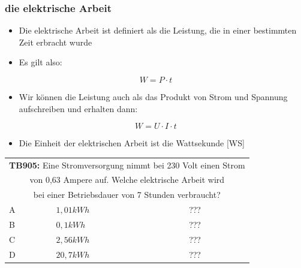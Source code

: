 \begin{frame}
	\frametitle{die elektrische Arbeit}
	\begin{itemize}
		\item	Die elektrische Arbeit ist definiert als die Leistung, die in einer bestimmten Zeit erbracht wurde
		\item	Es gilt also:
	\end{itemize}
	\begin{equation}
		W = P \cdot t
	\end{equation}
	\begin{itemize}
		\item	Wir können die Leistung auch als das Produkt von Strom und Spannung aufschreiben und erhalten dann:
	\end{itemize}
	\begin{equation}
		W = U \cdot I \cdot t
	\end{equation}
	\begin{itemize}
		\item	Die Einheit der elektrischen Arbeit ist die Wattsekunde [WS]
	\end{itemize}
\end{frame}

\begin{frame}
	\begin{small}	
	\begin{tabular}{|l|l|l|}
	\hline
		\multicolumn{3}{|c|}{\textbf{TB905:} Eine Stromversorgung nimmt bei 230 Volt einen Strom }\\
		\multicolumn{3}{|c|}{von 0,63 Ampere auf. Welche elektrische Arbeit  wird }\\
		\multicolumn{3}{|c|}{bei einer Betriebsdauer von 7 Stunden verbraucht?}\\
		\hline
		A & $1,01 kWh$ & ??? \\ \hline
		B & $0,1 kWh $ & ??? \\ \hline
		C & $2,56 kWh$ & ??? \\ \hline
		D & $20,7 kWh$ & ??? \\ \hline	
	\end{tabular}
	\end{small}
\end{frame}

